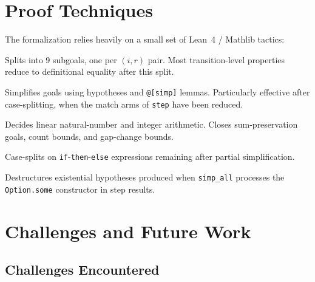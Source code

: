 \documentclass[11pt,a4paper]{article}
\begin{document}
\section{Proof Techniques}
\label{sec:techniques}

The formalization relies heavily on a small set of Lean~4 / Mathlib tactics:

\begin{description}[nosep]
  \item[\texttt{cases i <;> cases r}]
    Splits into 9 subgoals, one per $(i,r)$ pair.  Most transition-level
    properties reduce to definitional equality after this split.

  \item[\texttt{simp\_all}]
    Simplifies goals using hypotheses and \texttt{@[simp]} lemmas.
    Particularly effective after case-splitting, when the match arms
    of \texttt{step} have been reduced.

  \item[\texttt{omega}]
    Decides linear natural-number and integer arithmetic.  Closes
    sum-preservation goals, count bounds, and gap-change bounds.

  \item[\texttt{split\_ifs}]
    Case-splits on \texttt{if}-\texttt{then}-\texttt{else} expressions
    remaining after partial simplification.

  \item[\texttt{obtain}]
    Destructures existential hypotheses produced when \texttt{simp\_all}
    processes the \texttt{Option.some} constructor in step results.
\end{description}

\section{Challenges and Future Work}
\label{sec:challenges}

\subsection{Challenges Encountered}
\end{document}
